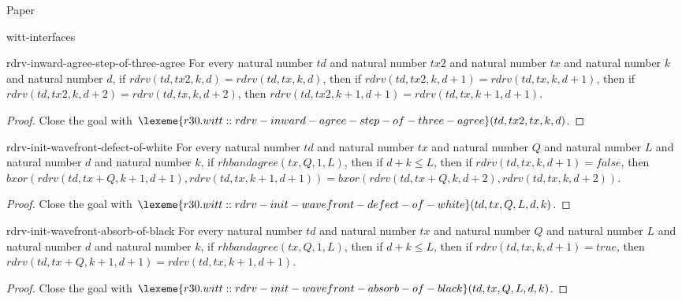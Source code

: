 \begin{lexlean}{Paper}
\begin{section}{witt-interfaces}
  \begin{theorem}{rdrv-inward-agree-step-of-three-agree}
  For every natural number \(td\) and natural number \(tx2\) and natural number \(tx\) and natural number \(k\) and natural number \(d\), if \(rdrv(td, tx2, k, d) = rdrv(td, tx, k, d)\), then if \(rdrv(td, tx2, k, d + 1) = rdrv(td, tx, k, d + 1)\), then if \(rdrv(td, tx2, k, d + 2) = rdrv(td, tx, k, d + 2)\), then \(rdrv(td, tx2, k + 1, d + 1) = rdrv(td, tx, k + 1, d + 1)\).
  \begin{proof}
  Close the goal with \(\lexeme{r30.witt::rdrv-inward-agree-step-of-three-agree}(td, tx2, tx, k, d)\).
  \end{proof}
  \end{theorem}

  \begin{theorem}{rdrv-init-wavefront-defect-of-white}
  For every natural number \(td\) and natural number \(tx\) and natural number \(Q\) and natural number \(L\) and natural number \(d\) and natural number \(k\), if \(rhbandagree(tx, Q, 1, L)\), then if \(d + k ≤ L\), then if \(rdrv(td, tx, k, d + 1) = false\), then \(bxor(rdrv(td, tx + Q, k + 1, d + 1), rdrv(td, tx, k + 1, d + 1)) = bxor(rdrv(td, tx + Q, k, d + 2), rdrv(td, tx, k, d + 2))\).
  \begin{proof}
  Close the goal with \(\lexeme{r30.witt::rdrv-init-wavefront-defect-of-white}(td, tx, Q, L, d, k)\).
  \end{proof}
  \end{theorem}

  \begin{theorem}{rdrv-init-wavefront-absorb-of-black}
  For every natural number \(td\) and natural number \(tx\) and natural number \(Q\) and natural number \(L\) and natural number \(d\) and natural number \(k\), if \(rhbandagree(tx, Q, 1, L)\), then if \(d + k ≤ L\), then if \(rdrv(td, tx, k, d + 1) = true\), then \(rdrv(td, tx + Q, k + 1, d + 1) = rdrv(td, tx, k + 1, d + 1)\).
  \begin{proof}
  Close the goal with \(\lexeme{r30.witt::rdrv-init-wavefront-absorb-of-black}(td, tx, Q, L, d, k)\).
  \end{proof}
  \end{theorem}


\end{section}
\end{lexlean}
